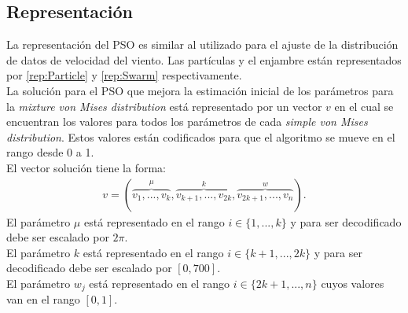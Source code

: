 \subsection{Representación}\label{sec:Representacion}
La representación del PSO es similar al utilizado para el ajuste de la distribución de datos de velocidad del viento. Las partículas y el enjambre están representados por \ref{rep:Particle} y \ref{rep:Swarm} respectivamente.\\
La solución para el PSO que mejora la estimación inicial de los parámetros para la \emph{mixture von Mises distribution} está representado por un vector $v$ en el cual se encuentran los valores para todos los parámetros de cada \emph{simple von Mises distribution}. Estos valores están codificados para que el algoritmo se mueve en el rango desde 0 a 1.\\
El vector solución tiene la forma:
\begin{align}
    v = (\overbrace{v_1,...,v_k}^{\mu},\overbrace{v_{k+1},...,v_{2k}}^{k},\overbrace{v_{2k+1},...,v_{n}}^{w}).
\end{align}
El parámetro $\mu$ está representado en el rango $i \in \{1,...,k\}$ y para ser decodificado debe ser escalado por $2\pi$.\\
El parámetro $k$ está representado en el rango $i \in \{k+1,...,2k\}$ y para ser decodificado debe ser escalado por $[0, 700]$.\\
El parámetro $w_j$ está representado en el rango $i \in \{2k+1,...,n\}$ cuyos valores van en el rango $[0,1]$.

